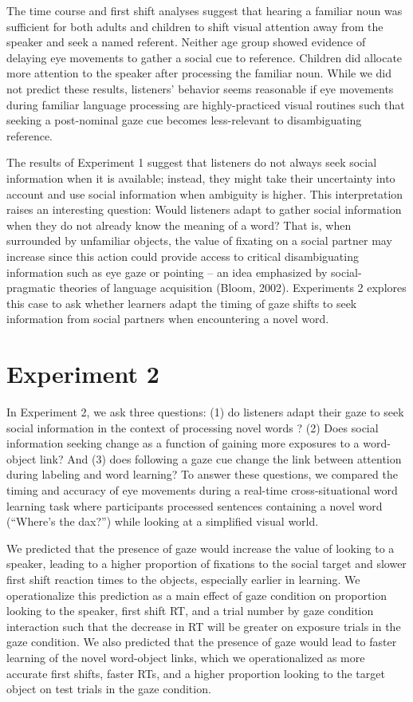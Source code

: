 \documentclass[10pt, letterpaper]{article}
\begin{document}
The time course and first shift analyses suggest that hearing a familiar
noun was sufficient for both adults and children to shift visual
attention away from the speaker and seek a named referent. Neither age
group showed evidence of delaying eye movements to gather a social cue
to reference. Children did allocate more attention to the speaker after
processing the familiar noun. While we did not predict these results,
listeners' behavior seems reasonable if eye movements during familiar
language processing are highly-practiced visual routines such that
seeking a post-nominal gaze cue becomes less-relevant to disambiguating
reference.

The results of Experiment 1 suggest that listeners do not always seek
social information when it is available; instead, they might take their
uncertainty into account and use social information when ambiguity is
higher. This interpretation raises an interesting question: Would
listeners adapt to gather social information when they do not already
know the meaning of a word? That is, when surrounded by unfamiliar
objects, the value of fixating on a social partner may increase since
this action could provide access to critical disambiguating information
such as eye gaze or pointing -- an idea emphasized by social-pragmatic
theories of language acquisition (Bloom, 2002). Experiments 2 explores
this case to ask whether learners adapt the timing of gaze shifts to
seek information from social partners when encountering a novel word.

\hypertarget{experiment-2}{%
\section{Experiment 2}\label{experiment-2}}

In Experiment 2, we ask three questions: (1) do listeners adapt their
gaze to seek social information in the context of processing novel words
? (2) Does social information seeking change as a function of gaining
more exposures to a word-object link? And (3) does following a gaze cue
change the link between attention during labeling and word learning? To
answer these questions, we compared the timing and accuracy of eye
movements during a real-time cross-situational word learning task where
participants processed sentences containing a novel word (``Where's the
dax?'') while looking at a simplified visual world.

We predicted that the presence of gaze would increase the value of
looking to a speaker, leading to a higher proportion of fixations to the
social target and slower first shift reaction times to the objects,
especially earlier in learning. We operationalize this prediction as a
main effect of gaze condition on proportion looking to the speaker,
first shift RT, and a trial number by gaze condition interaction such
that the decrease in RT will be greater on exposure trials in the gaze
condition. We also predicted that the presence of gaze would lead to
faster learning of the novel word-object links, which we operationalized
as more accurate first shifts, faster RTs, and a higher proportion
looking to the target object on test trials in the gaze condition.
\end{document}
